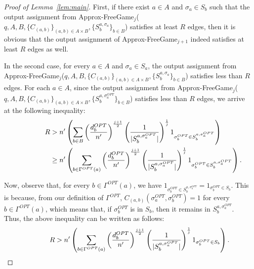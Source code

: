 \documentclass{article}
\begin{document}
\begin{proof}[Proof of Lemma~\ref{lem:main}]
First, if there exist $a \in A$ and $\sigma_a \in S_b$ such that the output assignment from {\sc Approx-FreeGame$_{j}$}($q, A, B, \{C_{(a, b)}\}_{(a, b) \in A \times B}, \{S^{a, \sigma_a}_b\}_{b \in B}$) satisfies at least $R$ edges, then it is obvious that the output assignment of {\sc Approx-FreeGame$_{j+1}$} indeed satisfies at least $R$ edges as well.

In the second case, for every $a \in A$ and $\sigma_a \in S_a$, the output assignment from {\sc Approx-FreeGame$_{j}$}($q, A, B, \{C_{(a, b)}\}_{(a, b) \in A \times B}, \{S^{a, \sigma_a}_b\}_{b \in B}$) satisfies less than $R$ edges. For each $a \in A$, since the output assignment from {\sc Approx-FreeGame$_{j}$}($q, A, B, \{C_{(a, b)}\}_{(a, b) \in A \times B}, \{S^{a, \sigma^{OPT}_a}_b\}_{b \in B}$) satisfies less than $R$ edges, we arrive at the following inequality:
\begin{align*}
  \hspace*{1.5cm} R &> n'\left(\sum_{b \in B} \left(\frac{d^{OPT}_b}{n'}\right)^\frac{j+1}{2}\left(\frac{1}{|S^{a, \sigma^{OPT}_a}_b|}\right)^\frac{1}{j}1_{\sigma_b^{OPT} \in S^{a, \sigma^{OPT}_a}_b}\right) \\
  \hspace*{1.5cm} &\geq n'\left(\sum_{b \in \Gamma^{OPT}(a)} \left(\frac{d^{OPT}_b}{n'}\right)^\frac{j+1}{2}\left(\frac{1}{|S^{a, \sigma^{OPT}_a}_b|}\right)^\frac{1}{j}1_{\sigma_b^{OPT} \in S^{a, \sigma^{OPT}_a}_b}\right).
\end{align*}

Now, observe that, for every $b \in \Gamma^{OPT}(a)$, we have $1_{\sigma_b^{OPT} \in S^{a, \sigma^{OPT}_a}_b} = 1_{\sigma_b^{OPT} \in S_b}$. This is because, from our definition of $\Gamma^{OPT}$, $C_{(a, b)}(\sigma^{OPT}_a, \sigma^{OPT}_b) = 1$ for every $b \in \Gamma^{OPT}(a)$, which means that, if $\sigma^{OPT}_b$ is in $S_b$, then it remains in $S^{a, \sigma^{OPT}_a}_b$. Thus, the above inequality can be written as follows:
\begin{align} \label{ine:1}
  \hspace*{1.5cm} R &> n'\left(\sum_{b \in \Gamma^{OPT}(a)} \left(\frac{d^{OPT}_b}{n'}\right)^\frac{j+1}{2}\left(\frac{1}{|S^{a, \sigma^{OPT}_a}_b|}\right)^\frac{1}{j}1_{\sigma_b^{OPT} \in S_b}\right).
\end{align}


\end{proof}
\end{document}
